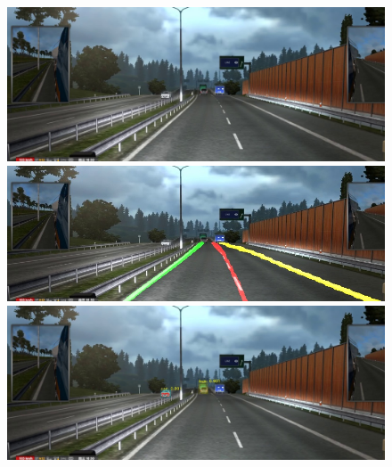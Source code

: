 \documentclass[runningheads]{llncs}
\begin{document}
\begin{figure}[!htb]
	\includegraphics[width=\linewidth]{result/w000092.jpg}
	\endminipage\hfill
	\includegraphics[width=\linewidth]{result/w000092-lane.jpg}
	\endminipage\hfill
	\includegraphics[width=\linewidth]{result/w000092-obj.jpg}
	\endminipage


\end{figure}
\end{document}
